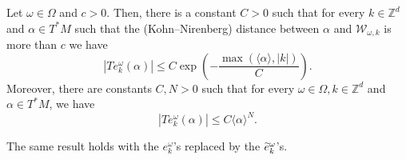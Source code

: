 \documentclass[AHL,Unicode,longabstracts,published]{cedram}
\newcommand{\p}[1]{\left(#1\right)}
\newcommand{\va}[1]{\left|#1\right|}
\newcommand{\brac}[1]{\langle #1 \rangle}
\newcommand{\clW}{\mathcal{W}}
\newcommand{\bbZ}{\mathbb{Z}}
\let\oldtilde\tilde
\renewcommand*{\tilde}[1]{\mathchoice{\widetilde{#1}}{\widetilde{#1}}{\oldtilde{#1}}{\oldtilde{#1}}}
\begin{document}
\begin{lemm}\label{lemma:localisation}
Let $\omega \in \Omega$ and $c > 0$. Then, there is a constant $C > 0$ such that for every $k \in \bbZ^d$ and $\alpha \in T^* M$ such that the (Kohn--Nirenberg) distance between $\alpha$ and $\clW_{\omega,k}$ is more than $c$ we have
\begin{equation}\label{eq:exponential_localisation}
\va{T e_k^\omega(\alpha)} \leq C \exp\p{- \frac{\max(\brac{\alpha},\va{k})}{C}}.
\end{equation}
Moreover, there are constants $C,N > 0$ such that for every $\omega \in \Omega,k \in \bbZ^d$ and $\alpha \in T^* M$, we have
\begin{equation}\label{eq:straight_local}
\va{T e_k^\omega(\alpha)} \leq C \brac{\alpha}^{N}.
\end{equation}

The same result holds with the $e_k^\omega$'s replaced by the $\tilde{e}_k^\omega$'s.
\end{lemm}
\end{document}
